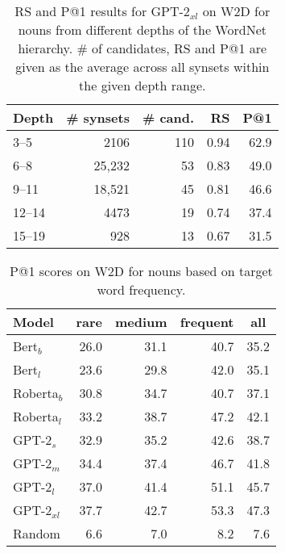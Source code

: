 \documentclass[11pt,a4paper]{article}
\begin{document}
\begin{table}
    \centering
    \begin{tabular}{l|rrrr}
        \hline
         \textbf{Depth} & \textbf{\# synsets} & \textbf{\# cand.} & \textbf{RS} & \textbf{P@1} \\ \hline
     3--5 & 2106 & 110 & 0.94 & 62.9 \\
     6--8 & 25,232 & 53 & 0.83 & 49.0 \\
     9--11 & 18,521 & 45 & 0.81 & 46.6 \\
     12--14 & 4473 & 19 & 0.74 & 37.4 \\ 
     15--19 & 928 & 13 & 0.67 & 31.5 \\ \hline
     
    \end{tabular}
    \caption{RS and P@1 results for GPT-2$_{xl}$  on W2D for
      nouns from different  depths of the WordNet hierarchy. \# of candidates, RS and P@1 are given as the average across all synsets within the given depth range. }
    \label{tab:WN_depth}
\end{table}



\begin{table}
    \centering
    \begin{tabular}{l|rrrr}
    \hline
         \textbf{Model} & \multicolumn{1}{c}{\textbf{rare}} & \multicolumn{1}{c}{\textbf{medium}} & \multicolumn{1}{c}{\textbf{frequent}} & \multicolumn{1}{c}{\textbf{all}} \\ \hline
     Bert$_{b}$ & 26.0 & 31.1 & 40.7 & 35.2 \\
     Bert$_{l}$ & 23.6 & 29.8 & 42.0 & 35.1 \\
     Roberta$_{b}$ & 30.8 & 34.7 & 40.7 & 37.1 \\
     Roberta$_{l}$ & 33.2 & 38.7 & 47.2 & 42.1 \\ \hline
     GPT-2$_{s}$ & 32.9 & 35.2 & 42.6 & 38.7 \\
     GPT-2$_{m}$ & 34.4 & 37.4 & 46.7 & 41.8 \\
     GPT-2$_{l}$ & 37.0 & 41.4 & 51.1 & 45.7 \\
     GPT-2$_{xl}$ & 37.7 & 42.7 & 53.3 & 47.3 \\ \hline
     Random & 6.6 & 7.0 & 8.2 & 7.6 \\ \hline 
     
    \end{tabular}
    \caption{P@1 scores on W2D for nouns based on target word frequency.}
    \label{tab:freq_results_W2D}
\end{table}
\end{document}
